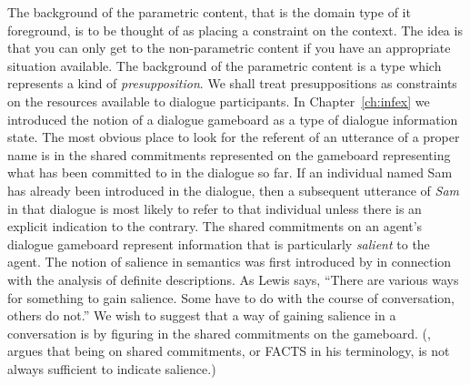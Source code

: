 The background of the parametric content, that is the domain type
of it foreground,
is to be thought of as placing a constraint on the context.  The idea
is that you can only get to the non-parametric content if you have an
appropriate situation available.  The background of the parametric
content is a type which represents a kind of \textit{presupposition}.  We shall treat
presuppositions as constraints on the resources available to dialogue
participants.  In Chapter~\ref{ch:infex} we introduced the notion of a
dialogue gameboard as a type of dialogue information state.  The most
obvious place to look for the referent of an utterance of a proper
name is in the shared commitments represented on the gameboard
representing what has been committed to in the dialogue so far.  If an
individual named Sam has already been introduced in the dialogue, then
a subsequent utterance of \textit{Sam} in that dialogue is most likely
to refer to that individual unless there is an explicit indication to
the contrary.  The shared commitments on an agent's dialogue gameboard
represent information that is particularly \textit{salient} to the
agent.  The notion of salience in semantics was first introduced by
\cite{Lewis1979} in connection with the analysis of definite
descriptions.  As Lewis says, ``There are various ways for something
to gain salience. Some have to do with the course of conversation,
others do not.''  We wish to suggest that a way of gaining salience in
a conversation is by figuring in the shared commitments on the
gameboard.  (\citealp{Ginzburg2012}, argues that being on shared
commitments, or FACTS in his terminology, is not always sufficient to
indicate salience.)

